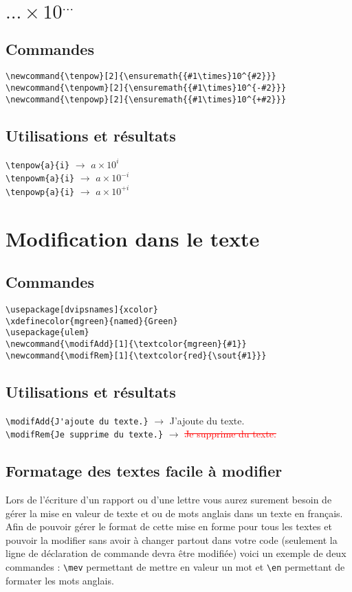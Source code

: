 \documentclass[11pt,a4paper]{article}
\newcommand{\tenpow}[2]{\ensuremath{{#1\times}10^{#2}}}
\newcommand{\tenpowm}[2]{\ensuremath{{#1\times}10^{-#2}}}
\newcommand{\tenpowp}[2]{\ensuremath{{#1\times}10^{+#2}}}
\newcommand{\modifAdd}[1]{\textcolor{mgreen}{#1}}
\newcommand{\modifRem}[1]{\textcolor{red}{\sout{#1}}}
\newcommand{\mev}[1]{\textbf{\huge{#1}}}
\newcommand{\en}[1]{\textit{#1}}
\begin{document}
\section*{\tenpow{...}{...}}
\subsection*{Commandes}
\verb|\newcommand{\tenpow}[2]{\ensuremath{{#1\times}10^{#2}}}|\\
\verb|\newcommand{\tenpowm}[2]{\ensuremath{{#1\times}10^{-#2}}}|\\
\verb|\newcommand{\tenpowp}[2]{\ensuremath{{#1\times}10^{+#2}}}|
\subsection*{Utilisations et résultats}
\verb|\tenpow{a}{i}| $\rightarrow$ \tenpow{a}{i}\\
\verb|\tenpowm{a}{i}| $\rightarrow$ \tenpowm{a}{i}\\
\verb|\tenpowp{a}{i}| $\rightarrow$ \tenpowp{a}{i}

\section*{Modification dans le texte}
\subsection*{Commandes}
\verb|\usepackage[dvipsnames]{xcolor}|\\
\verb|\xdefinecolor{mgreen}{named}{Green}|\\
\verb|\usepackage{ulem}|\\
\verb|\newcommand{\modifAdd}[1]{\textcolor{mgreen}{#1}}|\\
\verb|\newcommand{\modifRem}[1]{\textcolor{red}{\sout{#1}}}|
\subsection*{Utilisations et résultats}
\verb|\modifAdd{J'ajoute du texte.}| $\rightarrow$ \modifAdd{J'ajoute du texte.}\\
\verb|\modifRem{Je supprime du texte.}| $\rightarrow$ \modifRem{Je supprime du texte.}

\subsection*{Formatage des textes facile à modifier}
Lors de l'écriture d'un rapport ou d'une lettre vous aurez surement besoin de gérer la mise en valeur de texte et ou de mots anglais dans un texte en français. Afin de pouvoir gérer le format de cette mise en forme pour tous les textes et pouvoir la modifier sans avoir à changer partout dans votre code (seulement la ligne de déclaration de commande devra être modifiée) voici un exemple de deux commandes : \verb|\mev| permettant de mettre en valeur un mot et \verb|\en| permettant de formater les mots anglais.
\end{document}
